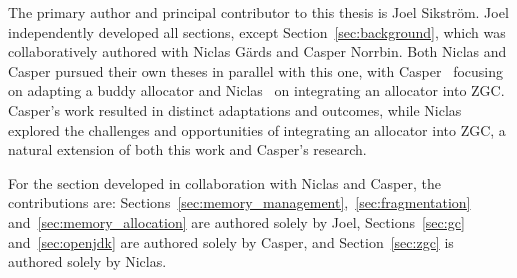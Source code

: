 
The primary author and principal contributor to this thesis is Joel Sikström. Joel independently developed all sections, except Section~\ref{sec:background}, which was collaboratively authored with Niclas Gärds and Casper Norrbin. Both Niclas and Casper pursued their own theses in parallel with this one, with Casper~\cite{casper} focusing on adapting a buddy allocator and Niclas~\cite{niclas} on integrating an allocator into ZGC. Casper's work resulted in distinct adaptations and outcomes, while Niclas explored the challenges and opportunities of integrating an allocator into ZGC, a natural extension of both this work and Casper's research.

For the section developed in collaboration with Niclas and Casper, the contributions are: Sections~\ref{sec:memory_management},~\ref{sec:fragmentation} and~\ref{sec:memory_allocation} are authored solely by Joel, Sections~\ref{sec:gc} and~\ref{sec:openjdk} are authored solely by Casper, and Section~\ref{sec:zgc} is authored solely by Niclas.

